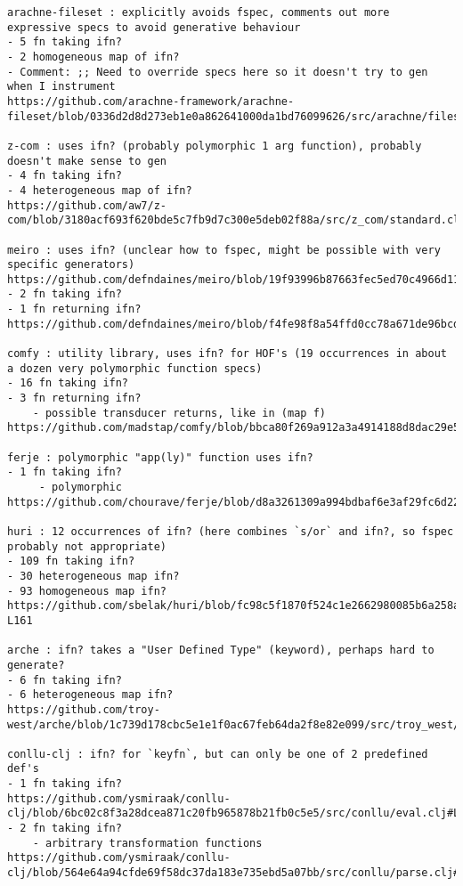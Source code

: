\begingroup
    \fontsize{5pt}{7pt}\selectfont
\begin{verbatim}
arachne-fileset : explicitly avoids fspec, comments out more expressive specs to avoid generative behaviour
- 5 fn taking ifn?
- 2 homogeneous map of ifn?
- Comment: ;; Need to override specs here so it doesn't try to gen when I instrument
https://github.com/arachne-framework/arachne-fileset/blob/0336d2d8d273eb1e0a862641000da1bd76099626/src/arachne/fileset/specs.clj#L7

z-com : uses ifn? (probably polymorphic 1 arg function), probably doesn't make sense to gen
- 4 fn taking ifn?
- 4 heterogeneous map of ifn?
https://github.com/aw7/z-com/blob/3180acf693f620bde5c7fb9d7c300e5deb02f88a/src/z_com/standard.cljs#L18

meiro : uses ifn? (unclear how to fspec, might be possible with very specific generators)
https://github.com/defndaines/meiro/blob/19f93996b87663fec5ed70c4966d114aa4855d6b/src/meiro/backtracker.clj#L17
- 2 fn taking ifn?
- 1 fn returning ifn?
https://github.com/defndaines/meiro/blob/f4fe98f8a54ffd0cc78a671de96bcd9727904c0c/src/meiro/core.clj#L201

comfy : utility library, uses ifn? for HOF's (19 occurrences in about a dozen very polymorphic function specs)
- 16 fn taking ifn?
- 3 fn returning ifn?
	- possible transducer returns, like in (map f)
https://github.com/madstap/comfy/blob/bbca80f269a912a3a4914188d8dac29e5edaca0b/src/madstap/comfy.cljc

ferje : polymorphic "app(ly)" function uses ifn?
- 1 fn taking ifn?
	 - polymorphic
https://github.com/chourave/ferje/blob/d8a3261309a994bdbaf6e3af29fc6d22c3e51844/src/ferje/util.clj#L33

huri : 12 occurrences of ifn? (here combines `s/or` and ifn?, so fspec probably not appropriate)
- 109 fn taking ifn?
- 30 heterogeneous map ifn?
- 93 homogeneous map ifn?
https://github.com/sbelak/huri/blob/fc98c5f1870f524c1e2662980085b6a258abd5cf/src/huri/core.clj#L159-L161

arche : ifn? takes a "User Defined Type" (keyword), perhaps hard to generate?
- 6 fn taking ifn?
- 6 heterogeneous map ifn?
https://github.com/troy-west/arche/blob/1c739d178cbc5e1e1f0ac67feb64da2f8e82e099/src/troy_west/arche/spec.clj#L36

conllu-clj : ifn? for `keyfn`, but can only be one of 2 predefined def's
- 1 fn taking ifn?
https://github.com/ysmiraak/conllu-clj/blob/6bc02c8f3a28dcea871c20fb965878b21fb0c5e5/src/conllu/eval.clj#L19
- 2 fn taking ifn?
	- arbitrary transformation functions
https://github.com/ysmiraak/conllu-clj/blob/564e64a94cfde69f58dc37da183e735ebd5a07bb/src/conllu/parse.clj#L42


\end{verbatim}
